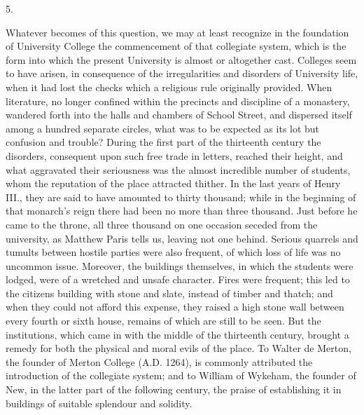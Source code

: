 5.

Whatever becomes of this
question, we may at least recognize in the foundation of University
College the commencement of that collegiate system, which is the form
into which the present University is almost or altogether cast.
Colleges seem to have arisen, in consequence of the irregularities and disorders of University life, when it had lost the
checks which a religious rule originally provided. When literature, no
longer confined within the precincts and discipline of a monastery,
wandered forth into the halls and chambers of School Street, and
dispersed itself among a hundred separate circles, what was to be
expected as its lot but confusion and trouble? During the first part
of the thirteenth century the disorders, consequent upon such free
trade in letters, reached their height, and what aggravated their
seriousness was the almost incredible number of students, whom the
reputation of the place attracted thither. In the last years of Henry
III., they are said to have amounted to thirty thousand; while in the
beginning of that monarch's reign there had been no more than three
thousand. Just before he came to the throne, all three thousand on one
occasion seceded from the university, as Matthew Paris tells us,
leaving not one behind. Serious quarrels and tumults between hostile
parties were also frequent, of which loss of life was no uncommon
issue. Moreover, the buildings themselves, in which the students were
lodged, were of a wretched and unsafe character. Fires were frequent;
this led to the citizens building with stone and slate, instead of
timber and thatch; and when they could not afford this expense, they
raised a high stone wall between every fourth or sixth house, remains
of which are still to be seen. But the institutions, which came in
with the middle of the thirteenth century, brought a remedy for both
the physical and moral evils of the place. To Walter de Merton, the
founder of Merton College (A.D.
1264), is commonly attributed the introduction of the collegiate
system; and to William of Wykeham, the founder of New, in the latter
part of the following century, the praise of establishing it in
buildings of suitable splendour and solidity.


